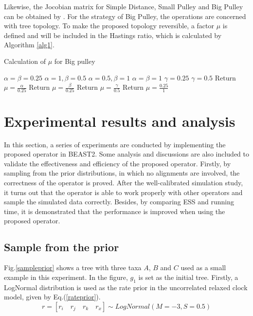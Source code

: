 \documentclass{bmcart}
\begin{document}
Likewise, the Jocobian matrix for Simple Distance, Small Pulley and Big Pulley can be obtained by . For the strategy of Big Pulley, the operations are concerned with tree topology. To make the proposed topology reversible, a factor $\mu$ is defined and will be included in the Hastings ratio, which is calculated by Algorithm \ref{alg1}. 
\begin{algorithm}
\caption{Calculation of $\mu$ for Big pulley}
\label{alg1}
\begin{algorithmic}[1]
\STATE $\alpha  = \beta  = 0.25$
\STATE $\alpha  = 1,\beta  = 0.5$
\STATE $\alpha  = 0.5,\beta  = 1$
\STATE $\alpha  = \beta  = 1$
\ENDIF
{}
\STATE $\gamma  = 0.25$
\ELSE
\STATE $\gamma  = 0.5$
\ENDIF
{}
\STATE Return $\mu = \frac{\alpha }{{0.25}}$
\ENDFOR
{}
\STATE Return $\mu = \frac{\beta }{{0.25}}$
\ENDFOR
{}
\STATE Return $\mu = \frac{\gamma }{{0.5}}$
\ENDFOR
{}
\STATE Return $\mu = \frac{{0.25}}{1}$
\ENDFOR
\end{algorithmic}
\end{algorithm}
\section*{Experimental results and analysis}
In this section, a series of experiments are conducted by implementing the proposed operator in BEAST2. Some analysis and discussions are also included to validate the effectiveness and efficiency of the proposed operator. Firstly, by sampling from the prior distributions, in which no alignments are involved, the correctness of the operator is proved. After the well-calibrated simulation study, it turns out that the operator is able to work properly with other operators and sample the simulated data correctly. Besides, by comparing ESS and running time, it is demonstrated that the performance is improved when using the proposed operator.
\subsection*{Sample from the prior}
Fig.\ref{sampleprior} shows a tree with three taxa $A$, $B$ and $C$ used as a small example in this experiment. In the figure, $g_1$ is set as the initial tree. Firstly, a LogNormal distribution is used as the rate prior in the uncorrelated relaxed clock model, given by Eq.(\ref{rateprior}).
\begin{equation}\label{rateprior}
r = [{r_i}\quad{r_j}\quad{r_k}\quad{r_x}] \sim LogNormal(M = -3, S = 0.5)
\end{equation}
\end{document}
